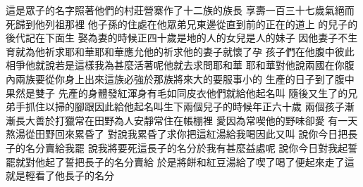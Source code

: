 這是眾子的名字\chientien 照著他們的村莊\chientien 營寨\chientien 作了十二族的族長\chuan 
{}享壽一百三十七歲\chientien 氣絕而死\chientien 歸到他列祖那裡\chuan 
{}他子孫的住處在他眾弟兄東邊\chientien 從直到前的\chientien 正在的道上\chuan\Chuan
{}的兒子的後代\chientien 記在下面\yuentien{}生\chientien 
{}娶為妻的時候\chientien 正四十歲\yuentien{}是地的人\chientien{}的女兒\chientien 是人的妹子\chuan 
{}因他妻子不生育\chientien 就為他祈求耶和華\chientien 耶和華應允他的祈求\chientien 他的妻子就懷了孕\chuan 
{}孩子們在他腹中彼此相爭\chientien 他就說\chientien 若是這樣\chientien 我為甚麼活著呢\yuentien{}他就去求問耶和華\chuan 
{}耶和華對他說\chientien 兩國在你腹內\chientien 兩族要從你身上出來\chientien 這族必強於那族\chientien 將來大的要服事小的\chuan 
{}生產的日子到了\chientien 腹中果然是雙子\chuan 
{}先產的身體發紅\chientien 渾身有毛\chientien 如同皮衣\yuentien 他們就給他起名叫\chuan{}
隨後又生了的兄弟\chientien 手抓住以掃的腳跟\chientien 因此給他起名叫\chuan{}生下兩個兒子的時候\chientien{}年正六十歲\chuan\Chuan
{}兩個孩子漸漸長大\chientien{}善於打獵\chientien 常在田野\yuentien{}為人安靜\chientien 常住在帳棚裡\chuan 
{}愛\chientien 因為常喫他的野味\yuentien{}卻愛\chuan 
{}有一天\chientien{}熬湯\chientien{}從田野回來累昏了\chuan 
{}對說\chientien 我累昏了\chientien 求你把這紅湯給我喝\yuentien 因此又叫\chuan{}
說\chientien 你今日把長子的名分賣給我罷\chuan 
{}說\chientien 我將要死\chientien 這長子的名分於我有甚麼益處呢\chuan 
{}說\chientien 你今日對我起誓罷\yuentien{}就對他起了誓\chientien 把長子的名分賣給\chuan 
{}於是將餅和紅豆湯給了\chientien{}喫了喝了\chientien 便起來走了\yuentien 這就是輕看了他長子的名分\chuan 
